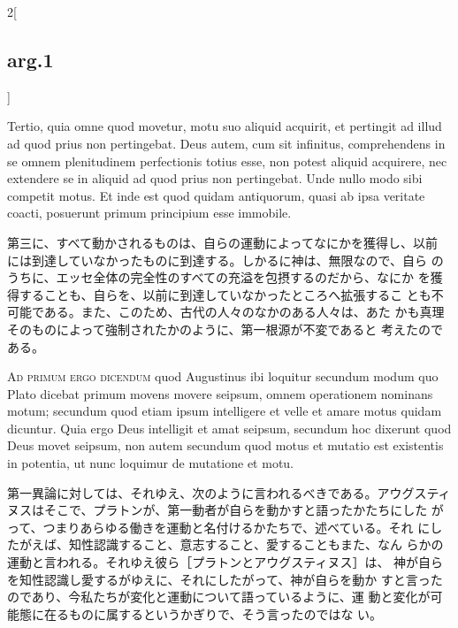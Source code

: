 \documentclass[paper=a4paper,fontsize=10pt,jafontsize=9pt,titlepage]{jlreq}
\begin{document}
\begin{paracol}{2}[\subsection{arg.1}]
\switchcolumn*

Tertio, quia omne quod movetur, motu suo aliquid acquirit, et
 pertingit ad illud ad quod prius non pertingebat. Deus autem, cum sit
 infinitus, comprehendens in se omnem plenitudinem perfectionis totius
 esse, non potest aliquid acquirere, nec extendere se in aliquid ad
 quod prius non pertingebat. Unde nullo modo sibi competit motus. Et
 inde est quod quidam antiquorum, quasi ab ipsa veritate coacti,
 posuerunt primum principium esse immobile.

\switchcolumn

第三に、すべて動かされるものは、自らの運動によってなにかを獲得し、以前
 には到達していなかったものに到達する。しかるに神は、無限なので、自ら
 のうちに、エッセ全体の完全性のすべての充溢を包摂するのだから、なにか
 を獲得することも、自らを、以前に到達していなかったところへ拡張するこ
 とも不可能である。また、このため、古代の人々のなかのある人々は、あた
 かも真理そのものによって強制されたかのように、第一根源が不変であると
 考えたのである。

\switchcolumn*[\subsection{ad.1}]

{\scshape Ad primum ergo dicendum} quod Augustinus ibi loquitur
 secundum modum quo Plato dicebat primum movens movere seipsum, omnem
 operationem nominans motum; secundum quod etiam ipsum intelligere et
 velle et amare motus quidam dicuntur. Quia ergo Deus intelligit et
 amat seipsum, secundum hoc dixerunt quod Deus movet seipsum, non
 autem secundum quod motus et mutatio est existentis in potentia, ut
 nunc loquimur de mutatione et motu.

\switchcolumn

第一異論に対しては、それゆえ、次のように言われるべきである。アウグスティ
 ヌスはそこで、プラトンが、第一動者が自らを動かすと語ったかたちにした
 がって、つまりあらゆる働きを運動と名付けるかたちで、述べている。それ
 にしたがえば、知性認識すること、意志すること、愛することもまた、なん
 らかの運動と言われる。それゆえ彼ら［プラトンとアウグスティヌス］は、
 神が自らを知性認識し愛するがゆえに、それにしたがって、神が自らを動か
 すと言ったのであり、今私たちが変化と運動について語っているように、運
 動と変化が可能態に在るものに属するというかぎりで、そう言ったのではな
 い。

\switchcolumn*[\subsection{ad.2}]


\end{paracol}
\end{document}
